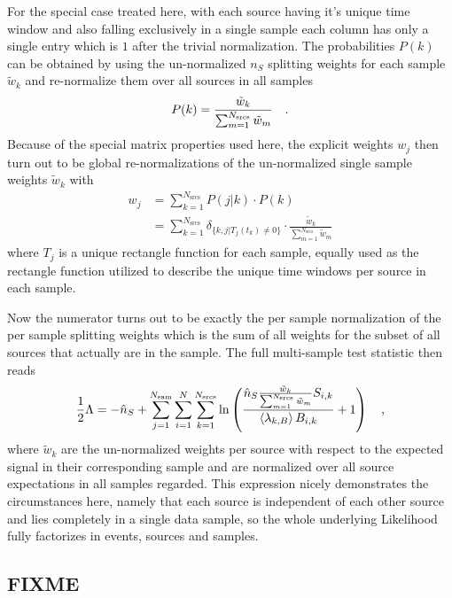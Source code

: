 For the special case treated here, with each source having it's unique time window and also falling exclusively in a single sample each column has only a single entry which is $1$ after the trivial normalization. 
The probabilities $P(k)$ can be obtained by using the un-normalized $n_S$ splitting weights for each sample $\tilde{w}_k$ and re-normalize them over all sources in all samples
\begin{equation}
  P(k) = \frac{\tilde{w}_k}{\sum_{m=1}^{N_\text{srcs}} \tilde{w}_m} \quad\text{.}
\end{equation}
Because of the special matrix properties used here, the explicit weights $w_j$ then turn out to be global re-normalizations of the un-normalized single sample weights $\tilde{w}_k$ with
\begin{align}
  w_j
    &= \sum_{k=1}^{N_\text{srcs}} P(j|k)\cdot P(k) \\
    &= \sum_{k=1}^{N_\text{srcs}}
      \delta_{\{k,j|T_j(t_k)\neq 0\}} \cdot
      \frac{\tilde{w}_k}{\sum_{m=1}^{N_\text{srcs}} \tilde{w}_m}
\end{align}
where $T_j$ is a unique rectangle function for each sample, equally used as the rectangle function utilized to describe the unique time windows per source in each sample.

Now the numerator turns out to be exactly the per sample normalization of the per sample splitting weights which is the sum of all weights for the subset of all sources that actually are in the sample.
The full multi-sample test statistic then reads
\begin{equation}
  \frac{1}{2}\Lambda
  = -\hat{n}_S +
    \sum_{j=1}^{N_\text{sam}} \sum_{i=1}^N \sum_{k=1}^{N_\text{srcs}}
    \ln\left(
      \frac{
        \hat{n}_{S}
        \frac{\tilde{w}_k}{\sum_{m=1}^{N_\text{srcs}} \tilde{w}_m} S_{i,k}}
      {\Braket{\lambda_{k,B}} B_{i,k}} + 1 \right)
  \quad\text{,}
\end{equation}
where $\tilde{w}_k$ are the un-normalized weights per source with respect to the expected signal in their corresponding sample and are normalized over all source expectations in all samples regarded.
This expression nicely demonstrates the circumstances here, namely that each source is independent of each other source and lies completely in a single data sample, so the whole underlying Likelihood fully factorizes in events, sources and samples.

\subsection{FIXME}



